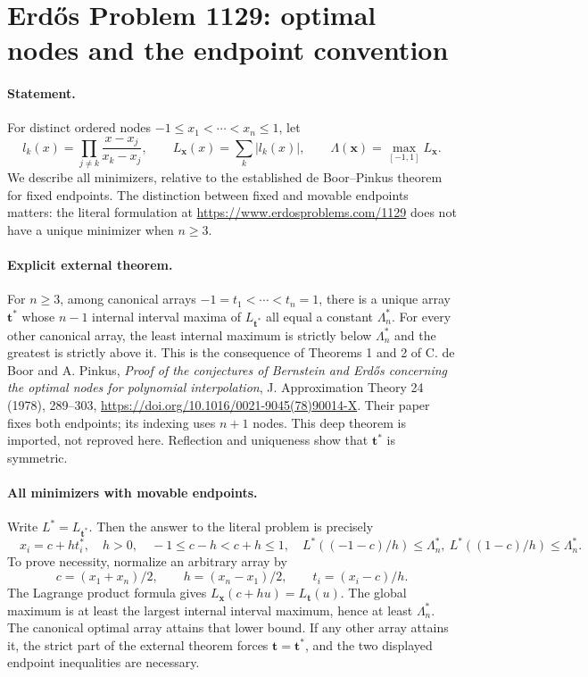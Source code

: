 \section*{Erd\H{o}s Problem 1129: optimal nodes and the endpoint convention}

\paragraph{Statement.}
For distinct ordered nodes \(-1\leq x_1<\cdots<x_n\leq1\), let
\[
 l_k(x)=\prod_{j\ne k}\frac{x-x_j}{x_k-x_j},
 \qquad L_{\boldsymbol x}(x)=\sum_k|l_k(x)|,
 \qquad\Lambda(\boldsymbol x)=\max_{[-1,1]}L_{\boldsymbol x}.
\]
We describe all minimizers, relative to the established de Boor--Pinkus theorem for fixed endpoints. The distinction between fixed and movable endpoints matters: the literal formulation at \url{https://www.erdosproblems.com/1129} does not have a unique minimizer when \(n\geq3\).

\paragraph{Explicit external theorem.}
For \(n\geq3\), among canonical arrays
\(-1=t_1<\cdots<t_n=1\), there is a unique array \(\boldsymbol t^*\) whose \(n-1\) internal interval maxima of \(L_{\boldsymbol t^*}\) all equal a constant \(\Lambda_n^*\).
For every other canonical array, the least internal maximum is strictly below \(\Lambda_n^*\) and the greatest is strictly above it.
This is the consequence of Theorems 1 and 2 of C. de Boor and A. Pinkus, \emph{Proof of the conjectures of Bernstein and Erd\H{o}s concerning the optimal nodes for polynomial interpolation}, J. Approximation Theory 24 (1978), 289--303, \url{https://doi.org/10.1016/0021-9045(78)90014-X}.
Their paper fixes both endpoints; its indexing uses \(n+1\) nodes. This deep theorem is imported, not reproved here.
Reflection and uniqueness show that \(\boldsymbol t^*\) is symmetric.

\paragraph{All minimizers with movable endpoints.}
Write \(L^*=L_{\boldsymbol t^*}\). Then the answer to the literal problem is precisely
\[
 \boxed{\quad x_i=c+h t_i^*,\quad h>0,\quad
 -1\leq c-h<c+h\leq1,\quad
 L^*((-1-c)/h)\leq\Lambda_n^*,\
 L^*((1-c)/h)\leq\Lambda_n^*.\quad}
\]
To prove necessity, normalize an arbitrary array by
\[
 c=(x_1+x_n)/2,\qquad h=(x_n-x_1)/2,\qquad t_i=(x_i-c)/h.
\]
The Lagrange product formula gives \(L_{\boldsymbol x}(c+hu)=L_{\boldsymbol t}(u)\).
The global maximum is at least the largest internal interval maximum, hence at least \(\Lambda_n^*\). The canonical optimal array attains that lower bound. If any other array attains it, the strict part of the external theorem forces \(\boldsymbol t=\boldsymbol t^*\), and the two displayed endpoint inequalities are necessary.

